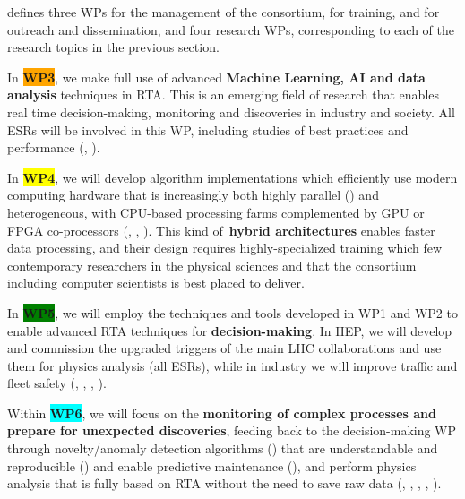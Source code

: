 



\acronym defines three WPs for the management of the consortium, for training, and for outreach and dissemination, and four research WPs, corresponding to each of the research topics in the previous section. 

In \textbf{\colorbox{orange}{WP3}}\color{black}, we make full use of advanced \textbf{Machine Learning, AI and data analysis} techniques in RTA. This is an emerging field of research that enables real time decision-making, monitoring and discoveries in industry and society. All ESRs will be involved in this WP, including studies of best practices and performance (\ESRh, \ESRi).

In \textbf{\colorbox{yellow}{WP4}}, we will develop algorithm implementations which efficiently use modern computing hardware that is increasingly both highly parallel (\ESRc) and heterogeneous, with CPU-based processing farms complemented by GPU or FPGA co-processors (\ESRf, \ESRg, \ESRl). 
This kind of~\textbf{hybrid architectures} enables faster data processing, and their design requires highly-specialized training which few contemporary researchers in the physical sciences and that the consortium including computer scientists is best placed to deliver. 

In \textbf{\colorbox{green}{WP5}}, we will employ the techniques and tools developed in WP1 and WP2 to enable advanced RTA techniques for \textbf{decision-making}. In HEP, we will develop and commission the upgraded triggers of the main LHC collaborations and use them for physics analysis (all ESRs), while in industry we will improve traffic and fleet safety (\ESRd, \ESRh, \ESRl, \ESRm).
 
Within \textbf{\colorbox{cyan}{WP6}}, we will focus on the \textbf{monitoring of complex processes and prepare for unexpected discoveries}, feeding back to the decision-making WP through novelty/anomaly detection algorithms (\ESRj) that are understandable and reproducible (\ESRx) and enable predictive maintenance (\ESRb), and perform physics analysis that is fully based on RTA without the need to save raw data (\ESRa, \ESRd, \ESRn, \ESRl, \ESRk). 

